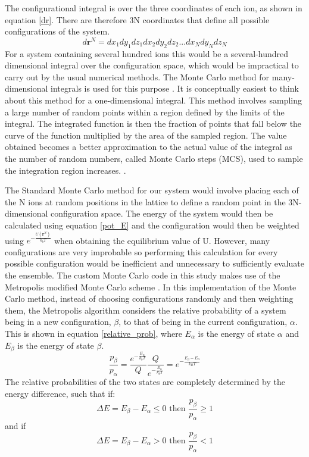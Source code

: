 The configurational integral is over the three coordinates of each ion, as shown in equation \ref{dr}. There are therefore 3N coordinates that define all possible configurations of the system.
\begin{equation}d \mathbf{r}^N = dx_1 dy_1 dz_1 dx_2 dy_2 dz_2... dx_N dy_N dz_N\end{equation}\label{dr}
For a system containing several hundred ions this would be a several-hundred dimensional integral over the configuration space, which would be impractical to carry out by the usual numerical methods. The Monte Carlo method for many-dimensional integrals is used for this purpose \cite{Metropolis}. It is conceptually easiest to think about this method for a one-dimensional integral. This method involves sampling a large number of random points within a region defined by the limits of the integral. The integrated function is then the fraction of points that fall below the curve of the function multiplied by the area of the sampled region. The value obtained becomes a better approximation to the actual value of the integral as the number of random numbers, called Monte Carlo steps (MCS), used to sample the integration region increases. \cite{Lesar3}.

The Standard Monte Carlo method for our system would involve placing each of the N ions at random positions in the lattice to define a random point in the 3N-dimensional configuration space. The energy of the system would then be calculated using equation \ref{pot_E} and the configuration would then be weighted using $e^{-\frac{U(\mathbf{r}^N)}{k_bT}}$ when obtaining the equilibrium value of U. However, many configurations are very improbable so performing this calculation for every possible configuration would be inefficient and unnecessary to sufficiently evaluate the ensemble. The custom Monte Carlo code in this study makes use of the Metropolis modified Monte Carlo scheme \cite{Metropolis}. In this implementation of the Monte Carlo method, instead of choosing configurations randomly and then weighting them, the Metropolis algorithm considers the relative probability of a system being in a new configuration, $\beta$, to that of being in the current configuration, $\alpha$. This is shown in equation \ref{relative_prob}, where $E_\alpha$ is the energy of state $\alpha$ and $E_\beta$ is the energy of state $\beta$.
\begin{equation}\label{relative_prob}
\frac{p_\beta}{p_\alpha} = \frac{  e^{-\frac{E_\alpha}{k_bT}} }{Q} \frac{Q}{  e^{-\frac{E_\alpha}{k_bT}} } = e^{- \frac{E_\beta - E_\alpha}{k_BT}}
\end{equation}
The relative probabilities of the two states are completely determined by the energy 
difference, such that if:
\begin{equation}\label{met}
\Delta E = E_{\beta} - E_{\alpha} \leq 0 \text{   then   } \frac{p_{\beta}}{p_{\alpha}} \geq 1 
\end{equation}
and if
\begin{equation}\label{met2}
\Delta E = E_{\beta} - E_{\alpha} > 0 \text{   then   } \frac{p_{\beta}}{p_{\alpha}} < 1
\end{equation}

